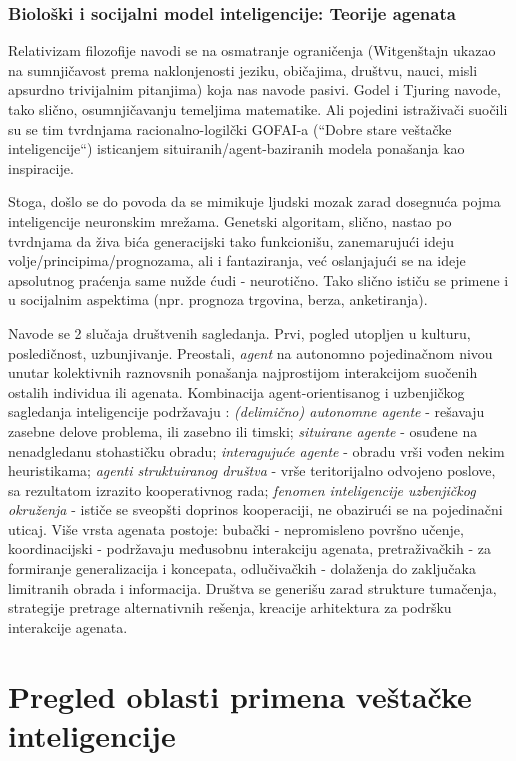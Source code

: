 \documentclass[fontsize=11bp, paper=a4]{scrartcl}
\begin{document}
\subsubsection{\normalsize{Biološki i socijalni model inteligencije: Teorije agenata}}
Relativizam filozofije navodi se na osmatranje ograničenja (Witgenštajn ukazao na sumnjičavost prema naklonjenosti jeziku, običajima, društvu, nauci, misli apsurdno trivijalnim pitanjima) koja nas navode pasivi. Godel i Tjuring navode, tako slično, osumnjičavanju temeljima matematike. 
Ali pojedini istraživači suočili su se tim tvrdnjama racionalno-logilčki GOFAI-a (``Dobre stare veštačke inteligencije``) isticanjem situiranih/agent-baziranih modela ponašanja kao inspiracije. 

Stoga, došlo se do povoda da se mimikuje ljudski mozak zarad dosegnuća pojma inteligencije neuronskim mrežama. 
Genetski algoritam, slično, nastao po tvrdnjama da živa bića generacijski tako funkcionišu, zanemarujući ideju volje/principima/prognozama, ali i fantaziranja, već oslanjajući se na ideje apsolutnog praćenja same nužde ćudi - neurotično\cite{neuroza}. 
Tako slično ističu se primene i u socijalnim aspektima (npr. prognoza trgovina, berza, anketiranja).

Navode se 2 slučaja društvenih sagledanja. Prvi, pogled utopljen u kulturu, posledičnost, uzbunjivanje. 
Preostali, \textit{agent} na autonomno pojedinačnom nivou unutar kolektivnih raznovsnih ponašanja najprostijom interakcijom suočenih ostalih individua ili agenata. Kombinacija agent-orientisanog i uzbenjičkog sagledanja inteligencije podržavaju : \textit{(delimično) autonomne agente} - rešavaju zasebne delove problema, ili zasebno ili timski; \textit{situirane agente} - osuđene na nenadgledanu stohastičku obradu; \textit{interagujuće agente} - obradu vrši vođen nekim heuristikama; \textit{agenti struktuiranog društva} - vrše teritorijalno odvojeno poslove, sa rezultatom izrazito kooperativnog rada; \textit{fenomen inteligencije uzbenjičkog okruženja} - ističe se sveopšti doprinos kooperaciji, ne obazirući se na pojedinačni uticaj. Više vrsta agenata postoje: bubački - nepromisleno površno učenje, koordinacijski - podržavaju međusobnu interakciju agenata, pretraživačkih - za formiranje generalizacija i koncepata, odlučivačkih - dolaženja do zaključaka  limitranih obrada i informacija.
Društva se generišu zarad strukture tumačenja, strategije pretrage alternativnih rešenja, kreacije arhitektura za podršku interakcije agenata.
\section{\normalsize{Pregled oblasti primena veštačke inteligencije}}
\end{document}
